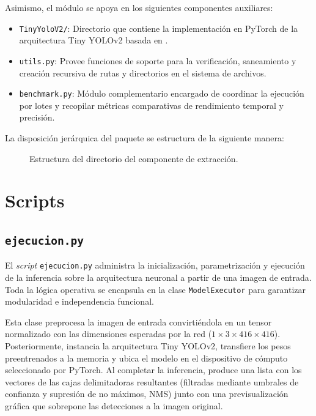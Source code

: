 Asimismo, el módulo se apoya en los siguientes componentes auxiliares:
\begin{itemize}
    \item \texttt{TinyYoloV2/}: Directorio que contiene la implementación en PyTorch de la arquitectura Tiny YOLOv2 basada en \parencite{yolov2_implementation}.
    \item \texttt{utils.py}: Provee funciones de soporte para la verificación, saneamiento y creación recursiva de rutas y directorios en el sistema de archivos.
    \item \texttt{benchmark.py}: Módulo complementario encargado de coordinar la ejecución por lotes y recopilar métricas comparativas de rendimiento temporal 
    y precisión.
\end{itemize}

La disposición jerárquica del paquete se estructura de la siguiente manera:
\begin{figure}[!htbp]
\caption{Estructura del directorio del componente de extracción.}
\label{fig:arbol_componente_extraccion}
\end{figure}

\section{Scripts}

\subsection{\texttt{ejecucion.py}}
El \textit{script} \texttt{ejecucion.py} administra la inicialización, parametrización y ejecución de la inferencia sobre la arquitectura neuronal a 
partir de una imagen de entrada. Toda la lógica operativa se encapsula en la clase \texttt{ModelExecutor} para garantizar modularidad e independencia funcional.
\medskip

Esta clase preprocesa la imagen de entrada convirtiéndola en un tensor normalizado con las dimensiones esperadas por la red ($1 \times 3 \times 416 \times 416$). 
Posteriormente, instancia la arquitectura Tiny YOLOv2, transfiere los pesos preentrenados a la memoria y ubica el modelo en el dispositivo de cómputo seleccionado 
por PyTorch. Al completar la inferencia, produce una lista con los vectores de las cajas delimitadoras resultantes 
(filtradas mediante umbrales de confianza y supresión de no máximos, NMS) junto con una previsualización gráfica que sobrepone las detecciones a la imagen original.

